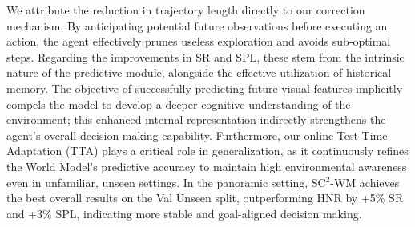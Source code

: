 \documentclass{article}
\theoremstyle{plain}
\theoremstyle{definition}
\theoremstyle{remark}
\begin{document}
We attribute the reduction in trajectory length directly to our correction mechanism. By anticipating potential future observations before executing an action, the agent effectively prunes useless exploration and avoids sub-optimal steps. Regarding the improvements in SR and SPL, these stem from the intrinsic nature of the predictive module, alongside the effective utilization of historical memory. The objective of successfully predicting future visual features implicitly compels the model to develop a deeper cognitive understanding of the environment; this enhanced internal representation indirectly strengthens the agent's overall decision-making capability. Furthermore, our online Test-Time Adaptation (TTA) plays a critical role in generalization, as it continuously refines the World Model's predictive accuracy to maintain high environmental awareness even in unfamiliar, unseen settings.
In the panoramic setting, 
SC$^{2}$-WM achieves the best overall results on the Val Unseen split, outperforming HNR by +5\% SR and +3\% SPL, indicating more stable and goal-aligned decision making.
\end{document}
